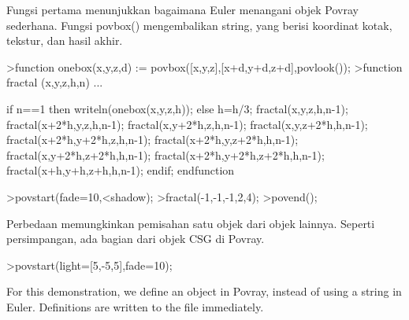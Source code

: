 \documentclass[a4paper,10pt]{article}
\begin{document}
\begin{eulernotebook}
\begin{eulercomment}
Fungsi pertama menunjukkan bagaimana Euler menangani objek Povray
sederhana. Fungsi povbox() mengembalikan string, yang berisi koordinat
kotak, tekstur, dan hasil akhir.
\end{eulercomment}
\begin{eulerprompt}
>function onebox(x,y,z,d) := povbox([x,y,z],[x+d,y+d,z+d],povlook());
>function fractal (x,y,z,h,n) ...
\end{eulerprompt}
\begin{eulerudf}
   if n==1 then writeln(onebox(x,y,z,h));
   else
     h=h/3;
     fractal(x,y,z,h,n-1);
     fractal(x+2*h,y,z,h,n-1);
     fractal(x,y+2*h,z,h,n-1);
     fractal(x,y,z+2*h,h,n-1);
     fractal(x+2*h,y+2*h,z,h,n-1);
     fractal(x+2*h,y,z+2*h,h,n-1);
     fractal(x,y+2*h,z+2*h,h,n-1);
     fractal(x+2*h,y+2*h,z+2*h,h,n-1);
     fractal(x+h,y+h,z+h,h,n-1);
   endif;
  endfunction
\end{eulerudf}
\begin{eulerprompt}
>povstart(fade=10,<shadow);
>fractal(-1,-1,-1,2,4);
>povend();
\end{eulerprompt}
\begin{eulercomment}
Perbedaan memungkinkan pemisahan satu objek dari objek lainnya.
Seperti persimpangan, ada bagian dari objek CSG di Povray.
\end{eulercomment}
\begin{eulerprompt}
>povstart(light=[5,-5,5],fade=10);
\end{eulerprompt}
\begin{eulercomment}
For this demonstration, we define an object in Povray, instead of
using a string in Euler. Definitions are written to the file
immediately.


\end{eulercomment}
\end{eulernotebook}
\end{document}
